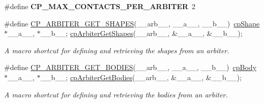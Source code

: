 \begin{DoxyCompactItemize}
\#define {\bfseries C\+P\+\_\+\+M\+A\+X\+\_\+\+C\+O\+N\+T\+A\+C\+T\+S\+\_\+\+P\+E\+R\+\_\+\+A\+R\+B\+I\+T\+ER}~2
\item 
\mbox{\label{group__cpArbiter_gaf6cd3e6766178e14b1204774890518c7}} 
\#define \hyperlink{group__cpArbiter_gaf6cd3e6766178e14b1204774890518c7}{C\+P\+\_\+\+A\+R\+B\+I\+T\+E\+R\+\_\+\+G\+E\+T\+\_\+\+S\+H\+A\+P\+ES}(\+\_\+\+\_\+arb\+\_\+\+\_\+,  \+\_\+\+\_\+a\+\_\+\+\_\+,  \+\_\+\+\_\+b\+\_\+\+\_\+)~\hyperlink{structcpShape}{cp\+Shape} $\ast$\+\_\+\+\_\+a\+\_\+\+\_\+, $\ast$\+\_\+\+\_\+b\+\_\+\+\_\+; \hyperlink{group__cpArbiter_ga521ac495c53bf25ab061a79643bb195a}{cp\+Arbiter\+Get\+Shapes}(\+\_\+\+\_\+arb\+\_\+\+\_\+, \&\+\_\+\+\_\+a\+\_\+\+\_\+, \&\+\_\+\+\_\+b\+\_\+\+\_\+);
\begin{DoxyCompactList}\small\item\em A macro shortcut for defining and retrieving the shapes from an arbiter. \end{DoxyCompactList}\item 
\mbox{\label{group__cpArbiter_ga57ae85df3f77d0fb62fe5b5c77b3a28f}} 
\#define \hyperlink{group__cpArbiter_ga57ae85df3f77d0fb62fe5b5c77b3a28f}{C\+P\+\_\+\+A\+R\+B\+I\+T\+E\+R\+\_\+\+G\+E\+T\+\_\+\+B\+O\+D\+I\+ES}(\+\_\+\+\_\+arb\+\_\+\+\_\+,  \+\_\+\+\_\+a\+\_\+\+\_\+,  \+\_\+\+\_\+b\+\_\+\+\_\+)~\hyperlink{structcpBody}{cp\+Body} $\ast$\+\_\+\+\_\+a\+\_\+\+\_\+, $\ast$\+\_\+\+\_\+b\+\_\+\+\_\+; \hyperlink{group__cpArbiter_gac5371d101c55a8a9c5b471e12010a8b3}{cp\+Arbiter\+Get\+Bodies}(\+\_\+\+\_\+arb\+\_\+\+\_\+, \&\+\_\+\+\_\+a\+\_\+\+\_\+, \&\+\_\+\+\_\+b\+\_\+\+\_\+);
\begin{DoxyCompactList}\small\item\em A macro shortcut for defining and retrieving the bodies from an arbiter. \end{DoxyCompactList}\end{DoxyCompactItemize}

